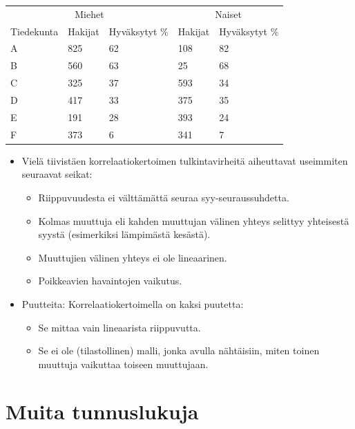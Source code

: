 \documentclass[
]{book}
\providecommand{\tightlist}{%
  \setlength{\itemsep}{0pt}\setlength{\parskip}{0pt}}
\begin{document}
\begin{table}
\centering\begingroup\fontsize{12}{14}\selectfont

\begin{tabular}{lllll}
\toprule
\multicolumn{3}{c}{Miehet} & \multicolumn{2}{c}{Naiset} \\
\cmidrule(l{3pt}r{3pt}){1-3} \cmidrule(l{3pt}r{3pt}){4-5}
Tiedekunta & Hakijat & Hyväksytyt \% & Hakijat & Hyväksytyt \%\\
\midrule
A & 825 & 62 & 108 & 82\\
B & 560 & 63 & 25 & 68\\
C & 325 & 37 & 593 & 34\\
D & 417 & 33 & 375 & 35\\
E & 191 & 28 & 393 & 24\\
\addlinespace
F & 373 & 6 & 341 & 7\\
\bottomrule
\end{tabular}
\endgroup{}
\end{table}

\FloatBarrier

\begin{itemize}
\tightlist
\item
  Vielä tiivistäen korrelaatiokertoimen tulkintavirheitä aiheuttavat useimmiten seuraavat seikat:

  \begin{itemize}
  \tightlist
  \item
    Riippuvuudesta ei välttämättä seuraa syy-seuraussuhdetta.
  \item
    Kolmas muuttuja eli kahden muuttujan välinen yhteys selittyy yhteisestä syystä (esimerkiksi lämpimästä kesästä).
  \item
    Muuttujien välinen yhteys ei ole lineaarinen.
  \item
    Poikkeavien havaintojen vaikutus.
  \end{itemize}
\item
  Puutteita: Korrelaatiokertoimella on kaksi puutetta:

  \begin{itemize}
  \tightlist
  \item
    Se mittaa vain lineaarista riippuvutta.
  \item
    Se ei ole (tilastollinen) malli, jonka avulla nähtäisiin, miten toinen muuttuja vaikuttaa toiseen muuttujaan.
  \end{itemize}
\end{itemize}

\hypertarget{alaluku65}{%
\section{Muita tunnuslukuja}\label{alaluku65}}
\end{document}
